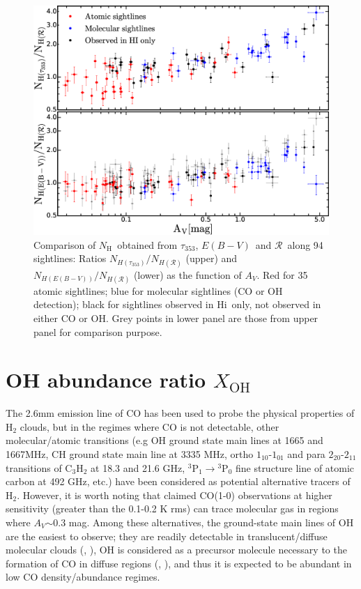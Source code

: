 \documentclass[preprint]{emulateapj}
\def\av{$A_{V}$}
\def\ebv{$E(B{-}V)$}
\def\h2{H$_2$}
\def\hi{H{\sc i}}
\def\NH{$N_\mathrm{H}$}
\def\t353{$\tau_{353}$}
\def\rad{$\mathcal{R}$}
\def\xoh{$X_\mathrm{OH}$}
\begin{document}
\begin{figure}
\includegraphics[width=1.0\linewidth]{fig/ratios_of_NH.eps}
\caption{Comparison of \NH\ obtained from \t353, \ebv\ and \rad\ along 94 sightlines: Ratios $N_{H(\tau_{353})}/N_{H(\mathcal{R})}$ (upper) and $N_{H(E(B-V))}/N_{H(\mathcal{R})}$ (lower) as the function of \av. Red for 35 atomic sightlines; blue for molecular sightlines (CO or OH detection); black for sightlines observed in \hi\ only, not observed in either CO or OH. Grey points in lower panel are those from upper panel for comparison purpose.}
\label{fig:ratios_of_nh}
\end{figure}

\section{OH abundance ratio \xoh}
\label{sec:xoh}
The 2.6mm emission line of CO has been used to probe the physical properties of \h2 clouds, but in the regimes where CO is not detectable, other molecular/atomic transitions (e.g OH ground state main lines at 1665 and 1667MHz, CH ground state main line at 3335 MHz, ortho $1_{10}$-$1_{01}$ and para $2_{20}$-$2_{11}$ transitions of C$_{3}$H$_{2}$ at 18.3 and 21.6 GHz, $^3$P$_1$$\rightarrow$$^3$P$_0$ fine structure line of atomic carbon at 492 GHz, etc.) have been considered as potential alternative tracers of \h2. However, it is worth noting that \cite{Cotten2013} claimed CO(1-0) observations at higher sensitivity (greater than the 0.1-0.2 K rms) can trace molecular gas in regions where \av$\sim$0.3 mag. Among these alternatives, the ground-state main lines of OH are the easiest to observe; they are readily detectable in translucent/diffuse molecular clouds (\citealt{Magnani1990}, \citealt{Barriault2010}), OH is considered as a precursor molecule necessary to the formation of CO in diffuse regions (\citealt{Black1977}, \citealt{Barriault2010}), and thus it is expected to be abundant in low CO density/abundance regimes.
\end{document}
